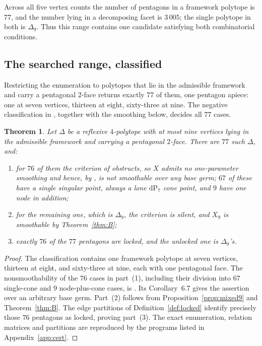 \documentclass[11pt]{amsart}
\newtheorem{theorem}{Theorem}[section]
\theoremstyle{definition}
\theoremstyle{remark}
\theoremstyle{plain}
\newcommand{\dP}{\mathrm{dP}}
\begin{document}
Across all five vertex counts the number of pentagons in a framework polytope
is
$77$, and the number lying in a decomposing facet is $3\,005$; the single
polytope in both is $\Delta_9$.  Thus this range contains one candidate satisfying both combinatorial
conditions.

\subsection{The searched range, classified}\label{sec:classify}
Restricting the enumeration to polytopes that lie in the admissible framework and
carry a pentagonal $2$-face returns exactly $77$ of them, one pentagon apiece:
one at seven vertices, thirteen at eight, sixty-three at nine.  The negative classification in \cite[Prop.~9.2]{PaperIV}, together
with the smoothing below, decides all $77$ cases.

\begin{theorem}\label{thm:C}
Let $\Delta$ be a reflexive $4$-polytope with at most nine vertices lying in the
admissible framework and carrying a pentagonal $2$-face.  There are $77$ such
$\Delta$, and:
\begin{enumerate}
\item for $76$ of them the criterion of \cite{PaperIV} obstructs, so $X$ admits no
  one-parameter smoothing \cite[Prop.~9.2]{PaperIV} and hence, by
  \cite[Cor.~6.7]{PaperIV}, is \emph{not smoothable} over any base germ; $67$ of these have a single
  singular point, always a lone $\dP_7$ cone point, and $9$ have one node in
  addition;
\item for the remaining one, which is $\Delta_9$, the criterion is silent, and
  $X_9$ \emph{is} smoothable by Theorem~\ref{thm:B};
\item exactly $76$ of the $77$ pentagons are locked, and the unlocked one is
  $\Delta_9$'s.
\end{enumerate}
\end{theorem}

\begin{proof}
The classification contains one framework polytope at seven vertices,
thirteen at eight, and sixty-three at nine, each with one pentagonal
face.  The nonsmoothability of the $76$ cases in part~(1), including
their division into $67$ single-cone and $9$ node-plus-cone cases,
is \cite[Prop.~9.2]{PaperIV}.  Its Corollary~6.7 gives the assertion
over an arbitrary base germ.  Part~(2) follows from
Proposition~\ref{prop:mixed9} and Theorem~\ref{thm:B}.
The edge partitions of Definition~\ref{def:locked} identify precisely
those $76$ pentagons as locked, proving part~(3).
The exact enumeration, relation matrices and partitions are
reproduced by the programs listed in Appendix~\ref{app:cert}.
\end{proof}
\end{document}
